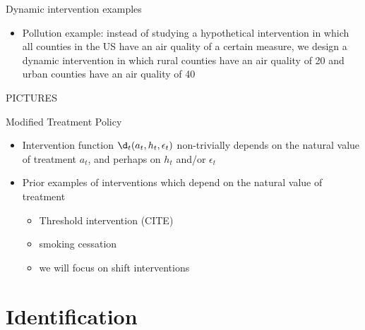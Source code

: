 \documentclass[
  10pt,
  ignorenonframetext,
]{beamer}
\providecommand{\tightlist}{%
  \setlength{\itemsep}{0pt}\setlength{\parskip}{0pt}}\usepackage{longtable,booktabs,array}
\begin{document}
\begin{frame}{Dynamic intervention examples}
\protect\hypertarget{dynamic-intervention-examples-2}{}
\begin{itemize}
\tightlist
\item
  Pollution example: instead of studying a hypothetical intervention in
  which all counties in the US have an air quality of a certain measure,
  we design a dynamic intervention in which rural counties have an air
  quality of 20 and urban counties have an air quality of 40
\end{itemize}

PICTURES
\end{frame}

\begin{frame}{Modified Treatment Policy}
\protect\hypertarget{modified-treatment-policy}{}
\begin{itemize}
\item
  Intervention function \(\d_t(a_t, h_t, \epsilon_t)\) non-trivially
  depends on the natural value of treatment \(a_t\), and perhaps on
  \(h_t\) and/or \(\epsilon_t\)
\item
  Prior examples of interventions which depend on the natural value of
  treatment

  \begin{itemize}
  \tightlist
  \item
    Threshold intervention (CITE)
  \item
    smoking cessation
  \item
    we will focus on shift interventions
  \end{itemize}
\end{itemize}
\end{frame}

\hypertarget{identification}{%
\section{Identification}\label{identification}}
\end{document}
